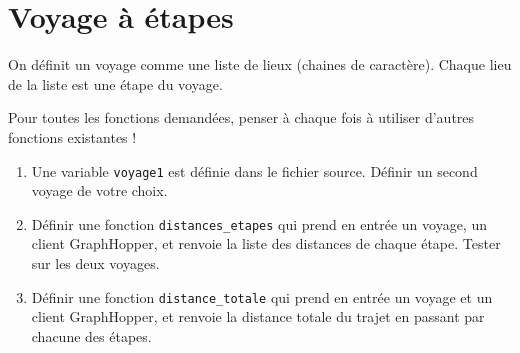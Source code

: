 \documentclass[11pt,a4paper]{article}
\begin{document}
\section{Voyage à étapes}
On définit un voyage comme une liste de lieux (chaines de caractère). Chaque lieu de la liste est une étape du voyage.

Pour toutes les fonctions demandées, penser à chaque fois à utiliser d'autres fonctions existantes !

\begin{enumerate}
    \item Une variable \verb+voyage1+ est définie dans le fichier source. Définir un second voyage de votre choix.
    \item Définir une fonction \verb+distances_etapes+ qui prend en entrée un voyage, un client GraphHopper, et renvoie la liste des distances de chaque étape. Tester sur les deux voyages.
    \item Définir une fonction \verb+distance_totale+ qui prend en entrée un voyage et un client GraphHopper, et renvoie la distance totale du trajet en passant par chacune des étapes.
\end{enumerate}
\end{document}
